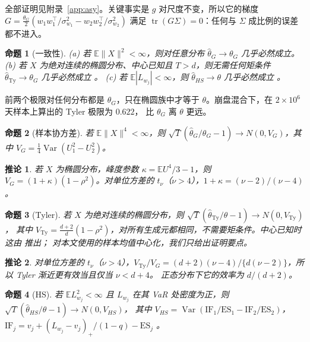 \documentclass[11pt,UTF8]{ctexart}
\newcommand{\E}{\mathbb{E}}
\newcommand{\ES}{\mathrm{ES}}
\newcommand{\Var}{\operatorname{Var}}
\newcommand{\tr}{\operatorname{tr}}
\newtheorem{proposition}{命题}
\newtheorem{corollary}{推论}
\begin{document}
全部证明见附录~\ref{app:asy}。关键事实是 $g$ 对尺度不变，所以它的梯度
$G=\frac{\theta_G}2(w_1w_1^\top/\sigma_{w_1}^2-w_2w_2^\top/\sigma_{w_2}^2)$ 满足 $\tr(G\Sigma)=0$：任何与 $\Sigma$ 成比例的误差都不进入。

\begin{proposition}[一致性]\label{prop:cons}
(a) 若 $\E\|X\|^2<\infty$，则对任意分布 $\hat\theta_G\to\theta_G$ 几乎必然成立。
(b) 若 $X$ 为绝对连续的椭圆分布、中心已知且 $T>d$，则无需任何矩条件 $\hat\theta_{\mathrm{Ty}}\to\theta_G$ 几乎必然成立 \citep{tyler1987}。
(c) 若 $\E|L_{w_j}|<\infty$，则 $\hat\theta_{HS}\to\theta$ 几乎必然成立 \citep{acerbi2002}。
\end{proposition}

前两个极限对任何分布都是 $\theta_G$，只在椭圆族中才等于 $\theta$。崩盘混合下，在 $2\times10^6$ 天样本上算出的 Tyler 极限为 $0.622$，
比 $\theta_G$ 离 $\theta$ 更远。

\begin{proposition}[样本协方差]\label{prop:clt}
若 $\E\|X\|^4<\infty$，则 $\sqrt T(\hat\theta_G/\theta_G-1)\to N(0,V_G)$，其中 $V_G=\frac14\Var(U_1^2-U_2^2)$。
\end{proposition}

\begin{corollary}\label{cor:vg}
若 $X$ 为椭圆分布，峰度参数 $\kappa=\E U^4/3-1$，则 $V_G=(1+\kappa)(1-\rho^2)$。对单位方差的 $t_\nu$（$\nu>4$），$1+\kappa=(\nu-2)/(\nu-4)$。
\end{corollary}

\begin{proposition}[Tyler]\label{prop:tyler}
若 $X$ 为绝对连续的椭圆分布，则 $\sqrt T(\hat\theta_{\mathrm{Ty}}/\theta-1)\to N(0,V_{\mathrm{Ty}})$，
其中 $V_{\mathrm{Ty}}=\frac{d+2}d(1-\rho^2)$，对所有生成元都相同，不需要矩条件。中心已知时这由 \citet{tyler1987} 推出；
对本文使用的样本均值中心化，我们只给出证明要点。
\end{proposition}

\begin{corollary}\label{cor:eff}
对单位方差的 $t_\nu$（$\nu>4$），$V_{\mathrm{Ty}}/V_G=(d+2)(\nu-4)/\{d(\nu-2)\}$，所以 Tyler 渐近更有效当且仅当 $\nu<d+4$。
正态分布下它的效率为 $d/(d+2)$。
\end{corollary}

\begin{proposition}[HS]\label{prop:hs}
若 $\E L_{w_j}^2<\infty$ 且 $L_{w_j}$ 在其 VaR 处密度为正，则 $\sqrt T(\hat\theta_{HS}/\theta-1)\to N(0,V_{HS})$，
其中 $V_{HS}=\Var(\mathrm{IF}_1/\ES_1-\mathrm{IF}_2/\ES_2)$，$\mathrm{IF}_j=v_j+(L_{w_j}-v_j)_+/(1-q)-\ES_j$ \citep{chen2008}。
\end{proposition}
\end{document}
